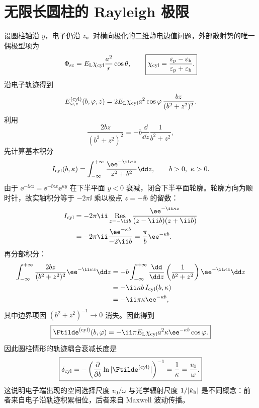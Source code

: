 \section{无限长圆柱的 Rayleigh 极限}
设圆柱轴沿 $y$，电子仍沿 $z$。对横向极化的二维静电边值问题，外部散射势的唯一偶极型项为
\begin{equation}
\Phi_{\rm sc}
=E_{\rm L}\chi_{\rm cyl}\frac{a^2}{r}\cos\theta,
\qquad
\boxed{
\chi_{\rm cyl}
=\frac{\varepsilon_{\rm p}-\varepsilon_{\rm h}}
{\varepsilon_{\rm p}+\varepsilon_{\rm h}}.}
\label{eq:chi-cylinder-general}
\end{equation}
沿电子轨迹得到
\begin{equation}
E_{\omega,z}^{(\rm cyl)}(b,\varphi,z)
=2E_{\rm L}\chi_{\rm cyl}a^2\cos\varphi\,
\frac{bz}{(b^2+z^2)^2}.
\label{eq:Ez-cylinder-general}
\end{equation}
利用
\begin{equation}
\frac{2bz}{(b^2+z^2)^2}
=-b\frac{\dd}{\dd z}\frac{1}{b^2+z^2},
\end{equation}
先计算基本积分
\begin{equation}
I_{\rm cyl}(b,\kappa)
=\int_{-\infty}^{+\infty}
\frac{\ee^{-\ii\kappa z}}{z^2+b^2}\dd z,
\qquad b>0,\ \kappa>0.
\end{equation}
由于 $\ee^{-\ii\kappa z}=\ee^{-\ii\kappa x}\ee^{\kappa y}$ 在下半平面 $y<0$ 衰减，闭合下半平面轮廓。轮廓方向为顺时针，故实轴积分等于 $-2\pi\ii$ 乘以极点 $z=-\ii b$ 的留数：
\begin{align}
I_{\rm cyl}
&=-2\pi\ii\operatorname*{Res}_{z=-\ii b}
\frac{\ee^{-\ii\kappa z}}{(z-\ii b)(z+\ii b)}\\
&=-2\pi\ii\frac{\ee^{-\kappa b}}{-2\ii b}
=\frac{\pi}{b}\ee^{-\kappa b}.
\label{eq:cylinder-basic-Fourier}
\end{align}
再分部积分：
\begin{align}
\int_{-\infty}^{+\infty}
\frac{2bz}{(b^2+z^2)^2}\ee^{-\ii\kappa z}\dd z
&=-b\int_{-\infty}^{+\infty}
\frac{\dd}{\dd z}\left(\frac{1}{b^2+z^2}\right)
\ee^{-\ii\kappa z}\dd z\\
&=-\ii\kappa b\,I_{\rm cyl}(b,\kappa)\\
&=-\ii\pi\kappa\ee^{-\kappa b},
\end{align}
其中边界项因 $(b^2+z^2)^{-1}\to0$ 消失。因此得到
\begin{equation}
\boxed{
\Ftilde^{(\rm cyl)}(b,\varphi)
=-\ii\pi E_{\rm L}\chi_{\rm cyl}a^2
\kappa\ee^{-\kappa b}\cos\varphi.}
\label{eq:F-cylinder-general}
\end{equation}
因此圆柱情形的轨迹耦合衰减长度是
\begin{equation}
\boxed{
\delta_{\rm cyl}
=-\left(\frac{\partial}{\partial b}\ln|\Ftilde^{(\rm cyl)}|\right)^{-1}
=\frac{1}{\kappa}
=\frac{v_0}{\omega}.}
\label{eq:cylinder-decay-general}
\end{equation}
这说明电子端出现的空间选择尺度 $v_0/\omega$ 与光学辐射尺度 $1/|k_{\rm h}|$ 是不同概念：前者来自电子沿轨迹积累相位，后者来自 Maxwell 波动传播。

